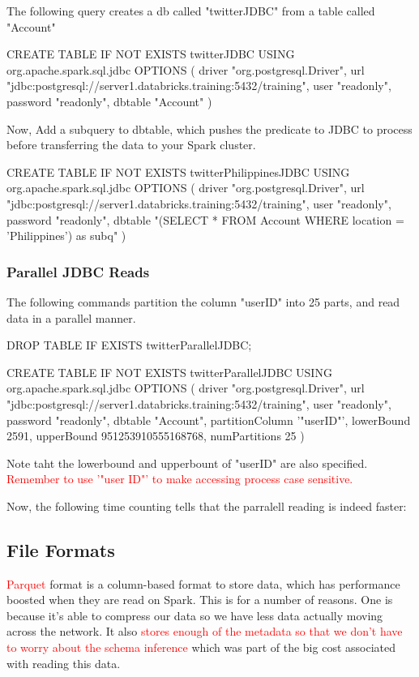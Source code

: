 \documentclass[12pt]{article}
\newcommand{\redp}[1]{\textcolor{red}{#1}}
\begin{document}
The following query creates a db called "twitterJDBC" from a table called "Account"
\begin{code}
CREATE TABLE IF NOT EXISTS twitterJDBC
USING org.apache.spark.sql.jdbc
OPTIONS (
  driver "org.postgresql.Driver",
  url "jdbc:postgresql://server1.databricks.training:5432/training",
  user "readonly",
  password "readonly",
  dbtable "Account"
)
\end{code}

Now, Add a subquery to dbtable, which pushes the predicate to JDBC to process before transferring the data to your Spark cluster.
\begin{code}
CREATE TABLE IF NOT EXISTS twitterPhilippinesJDBC
USING org.apache.spark.sql.jdbc
OPTIONS (
  driver "org.postgresql.Driver",
  url "jdbc:postgresql://server1.databricks.training:5432/training",
  user "readonly",
  password "readonly",
  dbtable "(SELECT * FROM Account WHERE location = 'Philippines') as subq"
)
\end{code}

\subsubsection{Parallel JDBC Reads}
The following commands partition the column "userID" into 25 parts, and read data in a parallel manner.
\begin{code}
DROP TABLE IF EXISTS twitterParallelJDBC;

CREATE TABLE IF NOT EXISTS twitterParallelJDBC
USING org.apache.spark.sql.jdbc
OPTIONS (
  driver "org.postgresql.Driver",
  url "jdbc:postgresql://server1.databricks.training:5432/training",
  user "readonly",
  password "readonly",
  dbtable "Account",
  partitionColumn '"userID"',
  lowerBound 2591,
  upperBound 951253910555168768,
  numPartitions 25
)
\end{code}
Note taht the lowerbound and upperbount of "userID" are also specified. \redp{Remember to use '"user ID"' to make accessing process case sensitive.}

Now, the following time counting tells that the parralell reading is indeed faster:
\begin{code}
\end{code}
\subsection{File Formats}
\redp{Parquet} format is a column-based format to store data, which has performance boosted when they are read on Spark. This is for a number of reasons. One is because it's able to compress our data so we have less data actually moving across the network. It also \redp{stores enough of the metadata so that we don't have to worry about the schema inference} which was part of the big cost associated with reading this data. 
\end{document}
